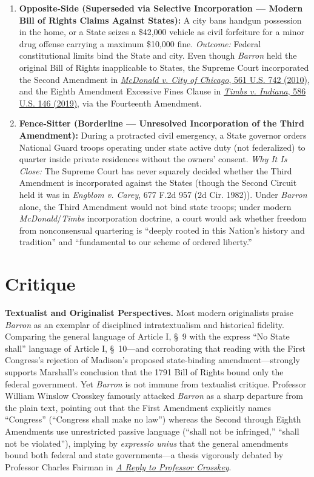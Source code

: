 \documentclass[12pt]{article}
\begin{document}
\begin{enumerate}
  \item \textbf{Opposite-Side (Superseded via Selective Incorporation --- Modern Bill of Rights Claims Against States):} A city bans handgun possession in the home, or a State seizes a \$42,000 vehicle as civil forfeiture for a minor drug offense carrying a maximum \$10,000 fine. \textit{Outcome:} Federal constitutional limits bind the State and city. Even though \textit{Barron} held the original Bill of Rights inapplicable to States, the Supreme Court incorporated the Second Amendment in \href{https://supreme.justia.com/cases/federal/us/561/742/}{\textit{McDonald v. City of Chicago}, 561 U.S. 742 (2010)}, and the Eighth Amendment Excessive Fines Clause in \href{https://supreme.justia.com/cases/federal/us/586/17-1091/}{\textit{Timbs v. Indiana}, 586 U.S. 146 (2019)}, via the Fourteenth Amendment.

  \item \textbf{Fence-Sitter (Borderline --- Unresolved Incorporation of the Third Amendment):} During a protracted civil emergency, a State governor orders National Guard troops operating under state active duty (not federalized) to quarter inside private residences without the owners' consent. \textit{Why It Is Close:} The Supreme Court has never squarely decided whether the Third Amendment is incorporated against the States (though the Second Circuit held it was in \textit{Engblom v. Carey}, 677 F.2d 957 (2d Cir. 1982)). Under \textit{Barron} alone, the Third Amendment would not bind state troops; under modern \textit{McDonald}/\textit{Timbs} incorporation doctrine, a court would ask whether freedom from nonconsensual quartering is ``deeply rooted in this Nation's history and tradition'' and ``fundamental to our scheme of ordered liberty.''
\end{enumerate}

\section{Critique}

\textbf{Textualist and Originalist Perspectives.} Most modern originalists praise \textit{Barron} as an exemplar of disciplined intratextualism and historical fidelity. Comparing the general language of Article I, \S~9 with the express ``No State shall'' language of Article I, \S~10---and corroborating that reading with the First Congress's rejection of Madison's proposed state-binding amendment---strongly supports Marshall's conclusion that the 1791 Bill of Rights bound only the federal government. Yet \textit{Barron} is not immune from textualist critique. Professor William Winslow Crosskey famously attacked \textit{Barron} as a sharp departure from the plain text, pointing out that the First Amendment explicitly names ``Congress'' (``Congress shall make no law'') whereas the Second through Eighth Amendments use unrestricted passive language (``shall not be infringed,'' ``shall not be violated''), implying by \textit{expressio unius} that the general amendments bound both federal and state governments---a thesis vigorously debated by Professor Charles Fairman in \href{https://chicagounbound.uchicago.edu/cgi/viewcontent.cgi?article=2869&context=uclrev}{\textit{A Reply to Professor Crosskey}}.
\end{document}
